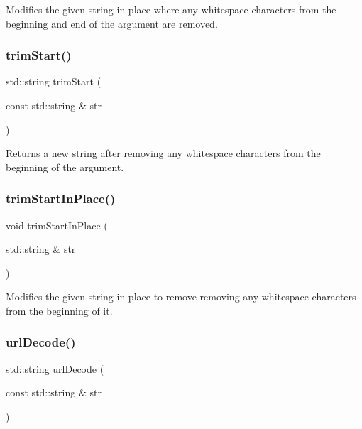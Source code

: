 Modifies the given string in-\/place where any whitespace characters from the beginning and end of the argument are removed. 

\mbox{\label{namespacesgl_1_1priv_1_1strlib_a3a00e1a99ff51e899181bb9011238c93}} 
\subsubsection{\texorpdfstring{trim\+Start()}{trimStart()}}
{\footnotesize\ttfamily std\+::string trim\+Start (\begin{DoxyParamCaption}\item[{const std\+::string \&}]{str }\end{DoxyParamCaption})}



Returns a new string after removing any whitespace characters from the beginning of the argument. 

\mbox{\label{namespacesgl_1_1priv_1_1strlib_a841f8a71a4e70a1a65ebcf9ed24e3334}} 
\subsubsection{\texorpdfstring{trim\+Start\+In\+Place()}{trimStartInPlace()}}
{\footnotesize\ttfamily void trim\+Start\+In\+Place (\begin{DoxyParamCaption}\item[{std\+::string \&}]{str }\end{DoxyParamCaption})}



Modifies the given string in-\/place to remove removing any whitespace characters from the beginning of it. 

\mbox{\label{namespacesgl_1_1priv_1_1strlib_a27232ef1c4000c2cf048d43b75d3faba}} 
\subsubsection{\texorpdfstring{url\+Decode()}{urlDecode()}}
{\footnotesize\ttfamily std\+::string url\+Decode (\begin{DoxyParamCaption}\item[{const std\+::string \&}]{str }\end{DoxyParamCaption})}



